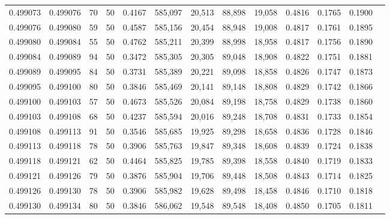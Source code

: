 \begin{tabular}{rrrrrrrrrrrrr}
0.499073 & 0.499076 &    70 &  50 &                                     0.4167 & 585,097 &  20,513 &  88,898 &  19,058 & 0.4816 & 0.1765 & 0.1900 \\
0.499076 & 0.499080 &    59 &  50 &                                     0.4587 & 585,156 &  20,454 &  88,948 &  19,008 & 0.4817 & 0.1761 & 0.1895 \\
0.499080 & 0.499084 &    55 &  50 &                                     0.4762 & 585,211 &  20,399 &  88,998 &  18,958 & 0.4817 & 0.1756 & 0.1890 \\
0.499084 & 0.499089 &    94 &  50 &                                     0.3472 & 585,305 &  20,305 &  89,048 &  18,908 & 0.4822 & 0.1751 & 0.1881 \\
0.499089 & 0.499095 &    84 &  50 &                                     0.3731 & 585,389 &  20,221 &  89,098 &  18,858 & 0.4826 & 0.1747 & 0.1873 \\
0.499095 & 0.499100 &    80 &  50 &                                     0.3846 & 585,469 &  20,141 &  89,148 &  18,808 & 0.4829 & 0.1742 & 0.1866 \\
0.499100 & 0.499103 &    57 &  50 &                                     0.4673 & 585,526 &  20,084 &  89,198 &  18,758 & 0.4829 & 0.1738 & 0.1860 \\
0.499103 & 0.499108 &    68 &  50 &                                     0.4237 & 585,594 &  20,016 &  89,248 &  18,708 & 0.4831 & 0.1733 & 0.1854 \\
0.499108 & 0.499113 &    91 &  50 &                                     0.3546 & 585,685 &  19,925 &  89,298 &  18,658 & 0.4836 & 0.1728 & 0.1846 \\
0.499113 & 0.499118 &    78 &  50 &                                     0.3906 & 585,763 &  19,847 &  89,348 &  18,608 & 0.4839 & 0.1724 & 0.1838 \\
0.499118 & 0.499121 &    62 &  50 &                                     0.4464 & 585,825 &  19,785 &  89,398 &  18,558 & 0.4840 & 0.1719 & 0.1833 \\
0.499121 & 0.499126 &    79 &  50 &                                     0.3876 & 585,904 &  19,706 &  89,448 &  18,508 & 0.4843 & 0.1714 & 0.1825 \\
0.499126 & 0.499130 &    78 &  50 &                                     0.3906 & 585,982 &  19,628 &  89,498 &  18,458 & 0.4846 & 0.1710 & 0.1818 \\
0.499130 & 0.499134 &    80 &  50 &                                     0.3846 & 586,062 &  19,548 &  89,548 &  18,408 & 0.4850 & 0.1705 & 0.1811 \\

\end{tabular}

